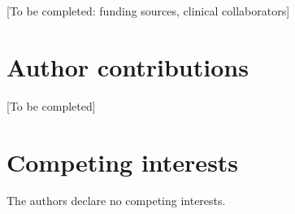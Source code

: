 \documentclass[pdflatex,sn-nature]{sn-jnl}
\begin{document}
[To be completed: funding sources, clinical collaborators]

\section*{Author contributions}

[To be completed]

\section*{Competing interests}

The authors declare no competing interests.
\end{document}
